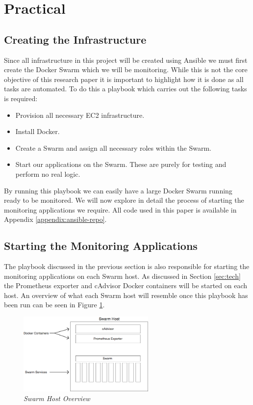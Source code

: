 \section{Practical}
\label{sec:practical}

\subsection{Creating the Infrastructure}
Since all infrastructure in this project will be created using Ansible we must first create the Docker Swarm which we will be monitoring. While this is not the core objective of this research paper it is important to highlight how it is done as all tasks are automated. To do this a playbook which carries out the following tasks is required: 

\begin{itemize}
	\item Provision all necessary EC2 infrastructure.
	\item Install Docker.
	\item Create a Swarm and assign all necessary roles within the Swarm.
	\item Start our applications on the Swarm. These are purely for testing and perform no real logic.
\end{itemize}

By running this playbook we can easily have a large Docker Swarm running ready to be monitored. We will now explore in detail the process of starting the monitoring applications we require. All code used in this paper is available in Appendix \ref{appendix:ansible-repo}.

\subsection{Starting the Monitoring Applications}

The playbook discussed in the previous section is also responsible for starting the monitoring applications on each Swarm host. As discussed in Section \ref{sec:tech} the Prometheus exporter and cAdvisor Docker containers will be started on each host. An overview of what each Swarm host will resemble once this playbook has been run can be seen in Figure \ref{fig:swarm-hosts}.

\begin{figure}[!h]
\centering
\includegraphics*[width=0.6\textwidth]{components/images/swarm-hosts}
\caption{\em Swarm Host Overview}
\label{fig:swarm-hosts}
\end{figure}

